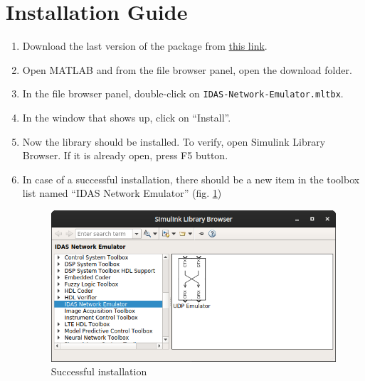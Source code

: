 \documentclass[a4paper, 11pt]{article}
\begin{document}
\section{Installation Guide}
\begin{enumerate}
\item Download the last version of the package from \href{https://github.com/m2-farzan/simulink-network-emulator/releases/latest/download/IDAS-Network-Emulator.mltbx}{this link}.
\item Open MATLAB and from the file browser panel, open the download folder.
\item In the file browser panel, double-click on \Verb~IDAS-Network-Emulator.mltbx~.
\item In the window that shows up, click on ``Install''.
\item Now the library should be installed. To verify, open Simulink Library Browser. If it is already open, press F5 button.
\item In case of a successful installation, there should be a new item in the toolbox list named ``IDAS Network Emulator'' (fig. \ref{good-install})
\begin{figure}[h]
\centering
\includegraphics[width=12cm]{img/good-install}
\caption{Successful installation}
\label{good-install}
\end{figure}
\end{enumerate}
\end{document}
